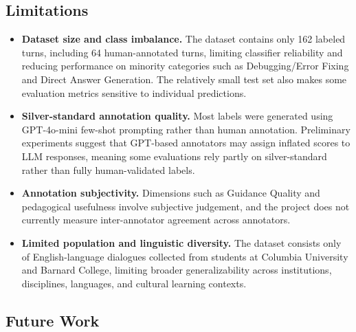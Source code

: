 \subsection{Limitations}

\begin{itemize}
    \item \textbf{Dataset size and class imbalance.} The dataset contains only 162 labeled turns, including 64 human-annotated turns, limiting classifier reliability and reducing performance on minority categories such as Debugging/Error Fixing and Direct Answer Generation. The relatively small test set also makes some evaluation metrics sensitive to individual predictions.

    \item \textbf{Silver-standard annotation quality.} Most labels were generated using GPT-4o-mini few-shot prompting rather than human annotation. Preliminary experiments suggest that GPT-based annotators may assign inflated scores to LLM responses, meaning some evaluations rely partly on silver-standard rather than fully human-validated labels.

    \item \textbf{Annotation subjectivity.} Dimensions such as Guidance Quality and pedagogical usefulness involve subjective judgement, and the project does not currently measure inter-annotator agreement across annotators.

    \item \textbf{Limited population and linguistic diversity.} The dataset consists only of English-language dialogues collected from students at Columbia University and Barnard College, limiting broader generalizability across institutions, disciplines, languages, and cultural learning contexts.
\end{itemize}

\subsection{Future Work}

